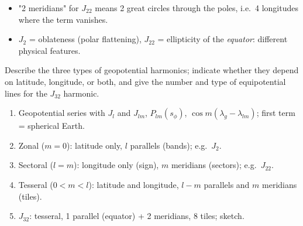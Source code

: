 \pitfalls
\begin{itemize}
\item "2 meridians" for $J_{22}$ means 2 great circles through the poles, i.e.\ 4 longitudes where the term vanishes.
\item $J_2$ = oblateness (polar flattening), $J_{22}$ = ellipticity of the \emph{equator}: different physical features.
\end{itemize}


\begin{qbox}
Describe the three types of geopotential harmonics; indicate whether they depend on latitude, longitude, or both, and give the
number and type of equipotential lines for the $J_{32}$ harmonic.
\end{qbox}

\begin{outline}
\begin{enumerate}
\item Geopotential series with $J_l$ and $J_{lm}$, $P_{lm}(s_\phi)$, $\cos m(\lambda_g-\lambda_{lm})$; first term = spherical Earth.
\item Zonal ($m=0$): latitude only, $l$ parallels (bands); e.g.\ $J_2$.
\item Sectoral ($l=m$): longitude only (sign), $m$ meridians (sectors); e.g.\ $J_{22}$.
\item Tesseral ($0<m<l$): latitude and longitude, $l-m$ parallels and $m$ meridians (tiles).
\item $J_{32}$: tesseral, 1 parallel (equator) + 2 meridians, 8 tiles; sketch.
\end{enumerate}
\end{outline}

\answer
